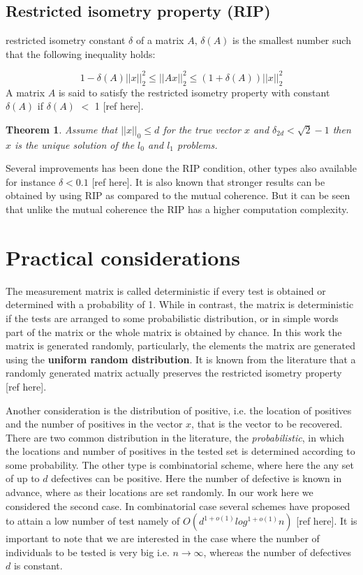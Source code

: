 \documentclass[12pt,a4paper]{article}
\newtheorem{theorem}{Theorem}
\begin{document}
\subsection{Restricted isometry property (RIP)}
restricted isometry constant $ \delta $ of a matrix $ A $, $ \delta (A) $ is the smallest number such that the following inequality holds: 

\begin{equation*}
1 - \delta(A) ||x||_{2}^{2} \leq ||Ax||_{2}^{2} \leq (1+\delta(A))||x||_{2}^{2}
\end{equation*} A matrix $ A $ is said to satisfy the restricted isometry property with constant $ \delta (A) $ if $ \delta (A) $ $<$ 1 [ref here]. 
\begin{theorem}
	Assume that $ ||x||_0 \leq d$ for the true vector $ x $ and $ \delta_{2d} < \sqrt{2} - 1$ then $ x $ is the unique solution of the $ l_0 $ and $ l_1 $ problems. 
\end{theorem} Several improvements has been done the RIP condition, other types also available for instance $ \delta < 0.1 $ [ref here]. It is also known that stronger results can be obtained by using RIP as compared to the mutual coherence. But it can be seen that unlike the mutual coherence the RIP has a higher computation complexity.   

\section{Practical considerations}

The measurement matrix is called deterministic if every test is obtained or determined with a probability of 1. While in contrast, the matrix is deterministic if the tests are arranged to some probabilistic distribution, or in simple words part of the matrix or the whole matrix is obtained by chance. In this work the matrix is generated randomly, particularly, the elements the matrix are generated using the \textbf{uniform random distribution}.  It is known from the literature that a randomly generated matrix actually preserves the restricted isometry property [ref here]. 

Another consideration is the distribution of positive, i.e. the location of positives and the number of positives in the vector $ x $, that is the vector to be recovered. There are two common distribution in the literature, the \textit{probabilistic}, in which the locations and number of positives in the tested set is determined according to some probability. The other type is combinatorial scheme, where here the any set of up to $ d $ defectives can be positive. Here the number of defective is known in advance, where as their locations are set randomly. In our work here we considered the second case. In combinatorial case several schemes have proposed to attain a low number of test namely of $ O(d^{1+o(1)} log^{1+o(1)} n) $ [ref here]. It is important to note that we are interested in the case where the number of individuals to be tested is very big i.e. $ n \rightarrow \infty$, whereas the number of defectives $ d $ is constant.  
\end{document}
